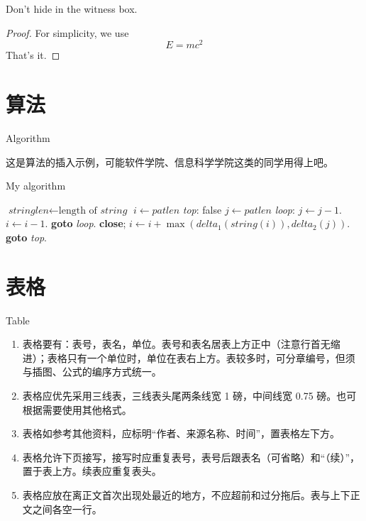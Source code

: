 \begin{law}\label{law:box}
Don't hide in the witness box.
\end{law}


\begin{proof}
For simplicity, we use
\[
E=mc^2
\]
That's it.
\end{proof}


\section{算法}{Algorithm}

这是算法的插入示例，可能软件学院、信息科学学院这类的同学用得上吧。
\begin{algorithm}
	\caption{My algorithm}\label{euclid}
	\begin{algorithmic}[1]
		\State $\textit{stringlen} \gets \text{length of }\textit{string}$
		\State $i \gets \textit{patlen}$
		\BState \emph{top}:
		 \Return false
		\EndIf
		\State $j \gets \textit{patlen}$
		\BState \emph{loop}:
		\State $j \gets j-1$.
		\State $i \gets i-1$.
		\State \textbf{goto} \emph{loop}.
		\State \textbf{close};
		\EndIf
		\State $i \gets i+\max(\textit{delta}_1(\textit{string}(i)),\textit{delta}_2(j))$.
		\State \textbf{goto} \emph{top}.
		\EndProcedure
	\end{algorithmic}
\end{algorithm}


\section{表格}{Table}

\begin{enumerate}
	\item 表格要有：表号，表名，单位。表号和表名居表上方正中（注意行首无缩进）；表格只有一个单位时，单位在表右上方。表较多时，可分章编号，但须与插图、公式的编序方式统一。
	\item 表格应优先采用三线表，三线表头尾两条线宽 1 磅，中间线宽 0.75 磅。也可根据需要使用其他格式。
	\item 表格如参考其他资料，应标明“作者、来源名称、时间”，置表格左下方。
	\item 表格允许下页接写，接写时应重复表号，表号后跟表名（可省略）和“（续）”，置于表上方。续表应重复表头。
	\item 表格应放在离正文首次出现处最近的地方，不应超前和过分拖后。表与上下正文之间各空一行。
\end{enumerate}


